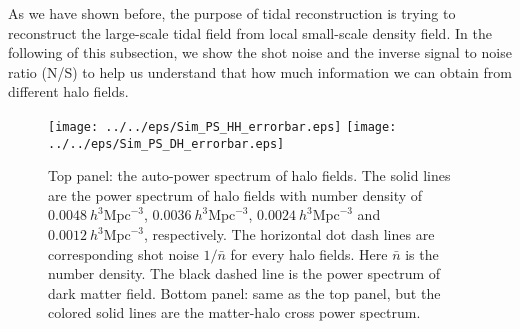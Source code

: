 As we have shown before, the purpose of tidal reconstruction is trying to
reconstruct the large-scale tidal field from local small-scale density
field. In the following of this subsection, we show the shot noise and
the inverse signal to noise ratio (N/S) to help us understand that
how much information we can obtain from different halo fields.\\
\begin{figure}[tbp]
\begin{center}
\texttt{[image: ../../eps/Sim\_PS\_HH\_errorbar.eps]}
\texttt{[image: ../../eps/Sim\_PS\_DH\_errorbar.eps]}
\end{center}
\caption{Top panel: the auto-power spectrum of halo fields. The 
solid lines are the power spectrum of halo fields with number density of
$0.0048\ h^{3}\mathrm{Mpc}^{-3}$, $0.0036\ h^{3}\mathrm{Mpc}^{-3}$, 
$0.0024\ h^{3}\mathrm{Mpc}^{-3}$ and $0.0012\ h^{3}\mathrm{Mpc}^{-3}$,
 respectively.
The horizontal dot dash lines are corresponding shot noise $1/\bar{n}$ 
for every halo fields. Here $\bar{n}$ is the number density.
The black dashed line is the power
spectrum of dark matter field.
Bottom panel: same as the top panel, but the colored solid lines are the 
matter-halo cross power spectrum.}
\label{fig:Sim_PS}
\end{figure}
